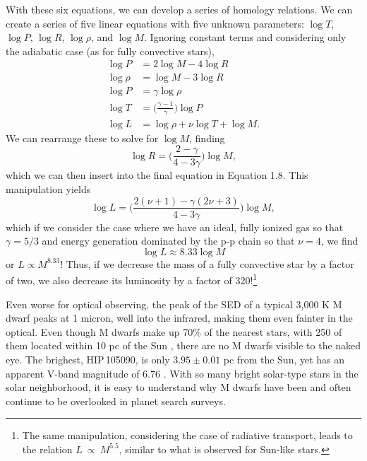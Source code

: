 With these six equations, we can develop a series of homology relations. We can create
a series of five linear equations with five unknown parameters: $\log T$, $\log P$, 
$\log R$, $\log \rho$, and $\log M$.
Ignoring constant terms and considering only the adiabatic case (as for fully 
convective stars),
\begin{align}
\log P &= 2 \log M - 4 \log R \nonumber \\
\log \rho &= \log M - 3 \log R \nonumber \\
\log P &= \gamma \log \rho \\
\log T &= \bigg(\frac{\gamma - 1}{\gamma}\bigg) \log P \nonumber \\
\log L &= \log \rho + \nu \log T + \log M \nonumber.
\end{align}
We can rearrange these to solve for $\log M$, finding
\begin{equation}
\log R = \bigg(\frac{2-\gamma}{4 - 3\gamma}\bigg) \log M,
\end{equation}
which we can then insert into the final equation in Equation 1.8.
This manipulation yields
\begin{equation}
\log L = \bigg(\frac{2(\nu + 1) - \gamma(2\nu + 3)}{4 - 3\gamma}\bigg) \log M,
\end{equation}
which if we consider the case where we have an ideal, fully ionized gas so that $\gamma = 5/3$ and energy generation dominated by the p-p chain so that $\nu = 4$, we find
\begin{equation}
\log L \approx 8.33 \log M
\end{equation}
or $L \propto M^{8.33}$! Thus, if we decrease the mass of a fully convective star by a factor of two, 
we also decrease its luminosity by a factor of 320!\footnote{The same manipulation,
considering the case of radiative transport, leads to the relation $L~\propto~M^{5.5}$,
similar to what is observed for Sun-like stars.} 

Even worse for optical observing,
the peak of the SED of a typical 3,000 K M dwarf peaks at 1 micron, well into the infrared, making them even fainter in the optical.
Even though M dwarfs make up 70\% of the nearest stars, with 250 of them located within
10 pc of the Sun \citep[e.g.][]{Henry06}, there are no M dwarfs visible to the naked 
eye.
The brighest, HIP\,105090, is only $3.95 \pm 0.01$ pc from the Sun, yet has an apparent V-band magnitude of 6.76 \citep{vanLeeuwen07}.
With so many bright solar-type stars in the solar neighborhood, it is easy to understand why M dwarfs have been and often continue to be overlooked in planet search
surveys. 

